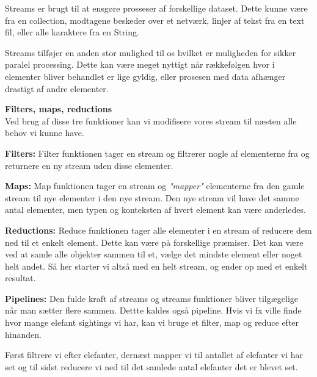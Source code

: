 \documentclass{article}
\begin{document}
Streams er brugt til at ensgøre prosseser af forskellige dataset. Dette kunne være fra en collection, modtagene beskeder over et netværk, linjer af tekst fra en text fil, eller alle karaktere fra en String.

Streams tilføjer en anden stor mulighed til os hvilket er muligheden for sikker paralel processing. Dette kan være meget nyttigt når rækkefølgen hvor i elementer bliver behandlet er lige gyldig, eller prosesen med data afhænger drastigt af andre elementer.

\textbf{Filters, maps, reductions} \\
Ved brug af disse tre funktioner kan vi modifisere vores stream til næsten alle behov vi kunne have. 

\textbf{Filters:}
Filter funktionen tager en stream og filtrerer nogle af elementerne fra og returnere en ny stream uden disse elementer.


\textbf{Maps:}
Map funktionen tager en stream og \textit{"mapper"} elementerne fra den gamle stream til nye elementer i den nye stream. Den nye stream vil have det samme antal elementer, men typen og konteksten af hvert element kan være anderledes.

\textbf{Reductions:}
Reduce funktionen tager alle elementer i en stream of reducere dem ned til et enkelt element. Dette kan være på forskellige præmiser. Det kan være ved at samle alle objekter sammen til et, vælge det mindste element eller noget helt andet.
Så her starter vi altså med en helt stream, og ender op med et enkelt resultat.

\textbf{Pipelines:}
Den fulde kraft af streams og streams funktioner bliver tilgægelige når man sætter flere sammen. Dettte kaldes også pipeline. Hvis vi fx ville finde hvor mange elefant sightings vi har, kan vi bruge et filter, map og reduce efter hinanden.

Først filtrere vi efter elefanter, dernæst mapper vi til antallet af elefanter vi har set og til sidst reducere vi ned til det samlede antal elefanter det er blevet set.
\end{document}
